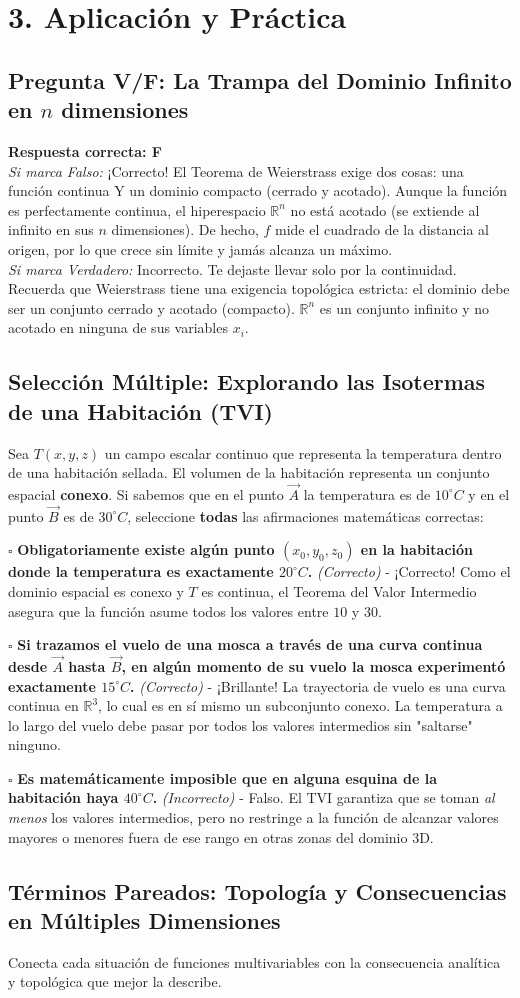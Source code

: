 \documentclass[11pt]{article}
\newenvironment{aplicacion}{%
  \section*{3. Aplicación y Práctica}%
}{}
\newenvironment{preguntaverdaderofalso}[1]{\subsection*{Pregunta V/F: #1}\par\vspace{0.1cm}}{\vspace{0.3cm}}
\newcommand{\verdaderofalso}[3]{\par\noindent\textbf{Respuesta correcta: #1} \\ \textit{Si marca Falso:} #2 \\ \textit{Si marca Verdadero:} #3\par\vspace{0.15cm}}
\newenvironment{preguntacasillas}[1]{\subsection*{Selección Múltiple: #1}\par\vspace{0.1cm}}{\vspace{0.3cm}}
\newcommand{\casilla}[3]{\par\noindent $\square$ \textbf{#1} \textit{(#2)} - #3\par\vspace{0.15cm}}
\newenvironment{pareados}[1]{\subsection*{Términos Pareados: #1}}{\vspace{0.3cm}}
\begin{document}
\begin{aplicacion}
\begin{preguntaverdaderofalso}{La Trampa del Dominio Infinito en $n$ dimensiones}
    \verdaderofalso{F}
      {¡Correcto! El Teorema de Weierstrass exige dos cosas: una función continua Y un dominio compacto (cerrado y acotado). Aunque la función es perfectamente continua, el hiperespacio $\mathbb{R}^n$ no está acotado (se extiende al infinito en sus $n$ dimensiones). De hecho, $f$ mide el cuadrado de la distancia al origen, por lo que crece sin límite y jamás alcanza un máximo.}
      {Incorrecto. Te dejaste llevar solo por la continuidad. Recuerda que Weierstrass tiene una exigencia topológica estricta: el dominio debe ser un conjunto cerrado y acotado (compacto). $\mathbb{R}^n$ es un conjunto infinito y no acotado en ninguna de sus variables $x_i$.}
  \end{preguntaverdaderofalso}

  \begin{preguntacasillas}{Explorando las Isotermas de una Habitación (TVI)}
    Sea $T(x,y,z)$ un campo escalar continuo que representa la temperatura dentro de una habitación sellada. El volumen de la habitación representa un conjunto espacial \textbf{conexo}. Si sabemos que en el punto $\vec{A}$ la temperatura es de $10^\circ C$ y en el punto $\vec{B}$ es de $30^\circ C$, seleccione \textbf{todas} las afirmaciones matemáticas correctas:
    
    \casilla{Obligatoriamente existe algún punto $(x_0,y_0,z_0)$ en la habitación donde la temperatura es exactamente $20^\circ C$.}{Correcto}{¡Correcto! Como el dominio espacial es conexo y $T$ es continua, el Teorema del Valor Intermedio asegura que la función asume todos los valores entre $10$ y $30$.}
    \casilla{Si trazamos el vuelo de una mosca a través de una curva continua desde $\vec{A}$ hasta $\vec{B}$, en algún momento de su vuelo la mosca experimentó exactamente $15^\circ C$.}{Correcto}{¡Brillante! La trayectoria de vuelo es una curva continua en $\mathbb{R}^3$, lo cual es en sí mismo un subconjunto conexo. La temperatura a lo largo del vuelo debe pasar por todos los valores intermedios sin "saltarse" ninguno.}
    \casilla{Es matemáticamente imposible que en alguna esquina de la habitación haya $40^\circ C$.}{Incorrecto}{Falso. El TVI garantiza que se toman \textit{al menos} los valores intermedios, pero no restringe a la función de alcanzar valores mayores o menores fuera de ese rango en otras zonas del dominio 3D.}
  \end{preguntacasillas}

  \begin{pareados}{Topología y Consecuencias en Múltiples Dimensiones}
    Conecta cada situación de funciones multivariables con la consecuencia analítica y topológica que mejor la describe.
    

\end{pareados}
\end{aplicacion}
\end{document}
